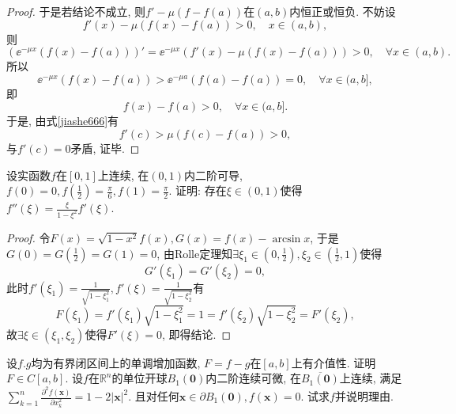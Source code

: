 \begin{quiza}
\begin{proof}
于是若结论不成立, 则\(f'-\mu\left(f-f(a)\right)\)在\((a,b)\)内恒正或恒负. 不妨设
\begin{equation}\label{jiashe666}
f'(x)-\mu\left(f(x)-f(a)\right)>0,\quad x\in(a,b),\tag{$\circledast$}
\end{equation}
则\[\left(\ee^{-\mu x}\left(f(x)-f(a)\right)\right)'=\ee^{-\mu x}\left(f'(x)-\mu\left(f(x)-f(a)\right)\right)>0,\quad\forall x\in(a,b).\]所以\[\ee^{-\mu x}\left(f(x)-f(a)\right)>\ee^{-\mu a}\left(f(a)-f(a)\right)=0,\quad\forall x\in(a,b],\]即\[f(x)-f(a)>0,\quad\forall x\in(a,b].\]于是, 由式\eqref{jiashe666}有\[f'(c)>\mu\left(f(c)-f(a)\right)>0,\]与\(f'(c)=0\)矛盾, 证毕.
\end{proof}
\woe 设实函数\(f\)在\([0,1]\)上连续, 在\((0,1)\)内二阶可导, \(f(0)=0,f\left(\frac{1}{2}\right)=\frac{\pi}{6},f(1)=\frac{\pi}{2}\). 证明: 存在\(\xi\in(0,1)\)使得\(f''(\xi)=\frac{\xi}{1-\xi^2}f'(\xi)\).
\begin{proof}
令\(F(x)=\sqrt{1-x^2}f(x),G(x)=f(x)-\arcsin x\), 于是\(G(0)=G\left(\frac{1}{2}\right)=G(1)=0\), 由Rolle定理知\(\exists \xi_1\in\left(0,\frac{1}{2}\right),\xi_2\in\left(\frac{1}{2},1\right)\)使得\[G'(\xi_1)=G'(\xi_2)=0,\]此时\(f'(\xi_1)=\frac{1}{\sqrt{1-\xi_1^2}},f'(\xi)=\frac{1}{\sqrt{1-\xi_2^2}}\)有\[F(\xi_1)=f'(\xi_1)\sqrt{1-\xi_1^2}=1=f'(\xi_2)\sqrt{1-\xi_2^2}=F'(\xi_2),\]故\(\exists \xi\in\left(\xi_1,\xi_2\right)\)使得\(F'(\xi)=0\), 即得结论.
\end{proof}

\woe 设\(f.g\)均为有界闭区间上的单调增加函数, \(F=f-g\)在\([a,b]\)上有介值性. 证明\(F\in C[a,b]\).
\woe 设\(f\)在\(\mathbb{R}^n\)的单位开球\(B_1(\boldsymbol{0})\)内二阶连续可微, 在\(\overline{B_1(\boldsymbol{0})}\)上连续, 满足\(\sum_{k=1}^{n}\frac{\partial^2f(\boldsymbol{x})}{\partial x_k^2}=1-2|\boldsymbol{x}|^2\). 且对任何\(\boldsymbol{x}\in\partial B_1(\boldsymbol{0}),f(\boldsymbol{x})=0\). 试求\(f\)并说明理由.
\end{quiza}
